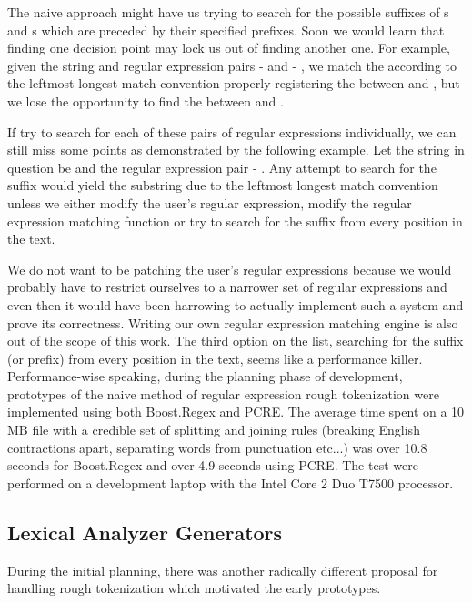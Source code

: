 The naive approach might have us trying to search for the possible suffixes of
\mayjoin{}s and \maysplit{}s which are preceded by their specified prefixes.
Soon we would learn that finding one decision point may lock us out of finding
another one. For example, given the string  and \maysplit{}
regular expression pairs  -  and  -
, we match the  according to the leftmost longest match
convention properly registering the \maysplit{} between  and
, but we lose the opportunity to find the \maysplit{} between
 and .

If try to search for each of these pairs of regular expressions individually,
we can still miss some points as demonstrated by the following example. Let the
string in question be  and the \maysplit{} regular
expression pair  - . Any attempt to search for the
suffix  would yield the  substring due to the
leftmost longest match convention unless we either modify the user's regular
expression, modify the regular expression matching function or try to search
for the suffix from every position in the text.

We do not want to be patching the user's regular expressions because we would
probably have to restrict ourselves to a narrower set of regular expressions
and even then it would have been harrowing to actually implement such a system
and prove its correctness. Writing our own regular expression matching engine
is also out of the scope of this work. The third option on the list, searching
for the suffix (or prefix) from every position in the text, seems like a
performance killer. Performance-wise speaking, during the planning phase of
development, prototypes of the naive method of regular expression rough
tokenization were implemented using both Boost.Regex and PCRE. The average time
spent on a 10 MB file with a credible set of splitting and joining rules
(breaking English contractions apart, separating words from punctuation
etc...) was over 10.8 seconds for Boost.Regex and over 4.9 seconds using PCRE.
The test were performed on a development laptop with the Intel Core 2 Duo T7500
processor.

\subsection{Lexical Analyzer Generators}

During the initial planning, there was another radically different proposal for
handling rough tokenization which motivated the early prototypes.

